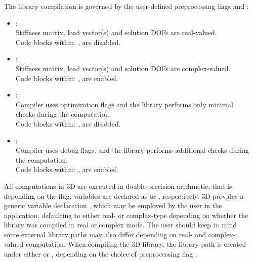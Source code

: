 The library compilation is governed by the user-defined preprocessing flags  and :
\begin{itemize}
	\itemsep 0pt
	\item{ :\\
	Stiffness matrix, load vector(s) and solution DOFs are real-valued.\\
	Code blocks within: , are disabled.
	} \item{ :\\
	Stiffness matrix, load vector(s) and solution DOFs are complex-valued.\\
	Code blocks within: , are enabled.
	} \item{ :\\
	Compiler uses optimization flags and the library performs only minimal checks during the computation.\\
	Code blocks within: , are disabled.
	} \item{ :\\
	Compiler uses debug flags, and the library performs additional checks during the computation.\\
	Code blocks within: , are enabled.
	}
\end{itemize}
All computations in \hp3D are executed in double-precision arithmetic; that is, depending on the  flag, variables are declared as  or , respectively. \hp3D provides a generic variable declaration , which may be employed by the user in the application, defaulting to either real- or complex-type depending on whether the library was compiled in real or complex mode. The user should keep in mind some external library paths may also differ depending on real- and complex-valued computation. When compiling the \hp3D library, the library path is created under either  or , depending on the choice of preprocessing flag .


